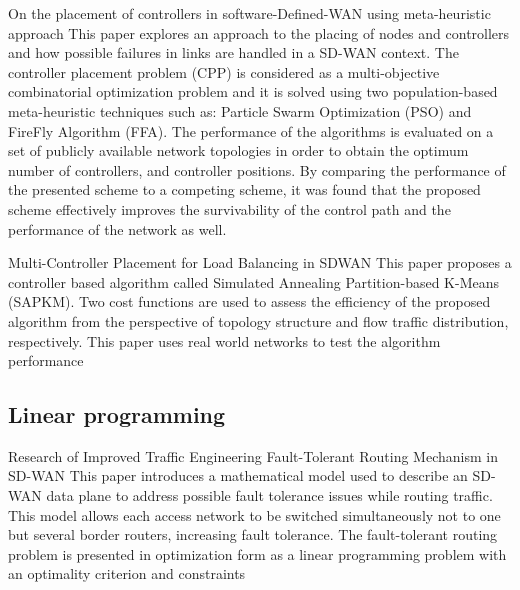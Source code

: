 \paperEntry
{On the placement of controllers in software-Defined-WAN using meta-heuristic approach \cite{controller_placements} }
{This paper explores an approach to the placing of nodes and controllers and how possible failures in links are handled in a SD-WAN context. The controller placement problem (CPP) is considered as a multi-objective combinatorial optimization problem and  it is solved using two population-based meta-heuristic techniques such as: Particle Swarm Optimization (PSO) and FireFly Algorithm (FFA). The performance of the algorithms is evaluated on a set of publicly available network topologies in order to obtain the optimum number of controllers, and controller positions. By comparing the performance of the presented scheme to a competing scheme, it was found that the proposed scheme effectively improves the survivability of the control path and the performance of the network as well.}

\paperEntry
{Multi-Controller Placement for
	Load Balancing in SDWAN \cite{multiple_placements} }
{This paper proposes a controller based algorithm called Simulated Annealing Partition-based K-Means (SAPKM). Two cost functions are used to assess the efficiency of the proposed algorithm from the perspective of topology structure and flow traffic distribution, respectively.
	This paper uses real world networks to test the algorithm performance}	

\subsection{Linear programming}

\paperEntry
{Research of Improved Traffic Engineering Fault-Tolerant Routing Mechanism in SD-WAN \cite{fault_tolerant}}
{This paper introduces a mathematical model used to describe an SD-WAN data plane to address possible fault tolerance issues while routing traffic. This model allows each access network to be switched simultaneously not to one but several border routers, increasing fault tolerance.
	The fault-tolerant routing problem is presented in
	optimization form as a linear programming problem with an
	optimality criterion and constraints}